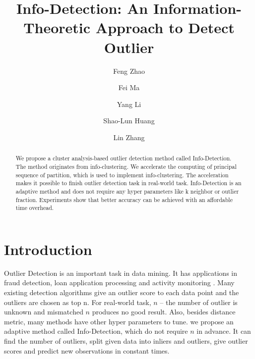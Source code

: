 \documentclass[runningheads]{llncs}
\begin{document}
%
\title{Info-Detection: An Information-Theoretic Approach to Detect Outlier}
%
%
\author{Feng Zhao \and
Fei Ma \and
Yang Li \and
Shao-Lun Huang  \and
Lin Zhang}
%
%
%
\maketitle              %
%
\begin{abstract}
We propose a cluster analysis-based outlier detection method called Info-Detection. The method originates from info-clustering. We accelerate the computing of principal sequence of partition, which is used to implement info-clustering. The acceleration makes it possible to finish outlier detection task in real-world task. Info-Detection is an adaptive method and does not require any hyper parameters like k neighbor or outlier fraction. Experiments show that better accuracy can be achieved with an affordable time overhead.

\end{abstract}
%
%
%
\section{Introduction}
Outlier Detection is an important task in data mining. It has applications in fraud detection, loan application processing and activity monitoring \cite{Hodge2004}. Many existing detection algorithms give an outlier score to each data point and the outliers are chosen as top n. For real-world task, $n$ -- the number of outlier is unknown and mismatched $n$ produces no good result. Also, besides distance metric, many methods have other hyper parameters to tune. we propose an adaptive method called Info-Detection, which do not require $n$ in advance. It can find the number of outliers, split given data into inliers and outliers, give outlier scores and predict new observations in constant times.
 
\end{document}

